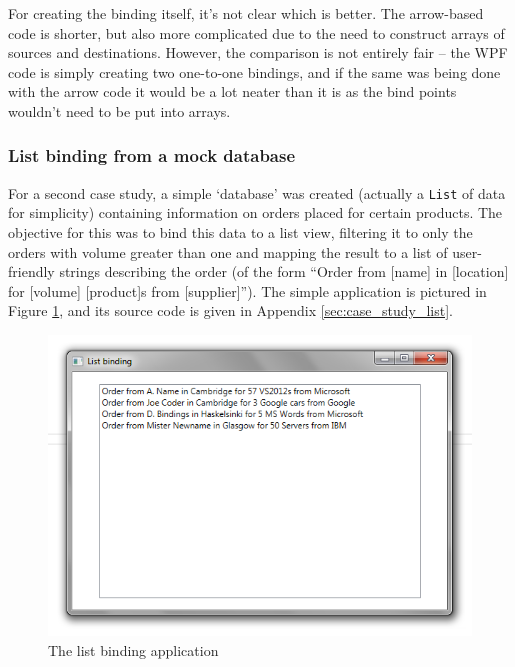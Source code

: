 \documentclass[12pt,twoside,notitlepage]{report}
\begin{document}
For creating the binding itself, it's not clear which is better. The arrow-based code is shorter, but also more complicated due to the need to construct arrays of sources and destinations. However, the comparison is not entirely fair -- the WPF code is simply creating two one-to-one bindings, and if the same was being done with the arrow code it would be a lot neater than it is as the bind points wouldn't need to be put into arrays.

\subsubsection{List binding from a mock database}

For a second case study, a simple `database' was created (actually a \texttt{List} of data for simplicity) containing information on orders placed for certain products. The objective for this was to bind this data to a list view, filtering it to only the orders with volume greater than one and mapping the result to a list of user-friendly strings describing the order (of the form ``Order from [name] in [location] for [volume] [product]s from [supplier]''). The simple application is pictured in Figure \ref{fig:case_study_list}, and its source code is given in Appendix \ref{sec:case_study_list}.


\begin{figure}[!ht]
  \centering
  \includegraphics[width=\textwidth]{fig/CaseStudyListBinding.png}
  \caption{The list binding application}
  \label{fig:case_study_list}
\end{figure}
\end{document}
